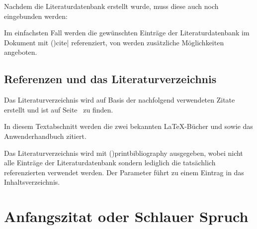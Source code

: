 \documentclass[%
  english,ngerman,%
  cdgeometry=no,DIV=12,%
  cd=false,cdfont=false,cdtitle=true,%
  headings=normal,%
  automark,%
  listof=toc,%
]{tudscrartcl}
\begin{document}
%
Nachdem die Literaturdatenbank erstellt wurde, muss diese auch noch eingebunden 
werden:
%
\begin{Preamble}


\end{Preamble}
%
Im einfachsten Fall werden die gewünschten Einträge der Literaturdatenbank im 
Dokument mit \Macro(){cite|} referenziert, 
von  werden zusätzliche Möglichkeiten angeboten.
%
\begin{refsection}
\begin{Trunk+}
\section{Referenzen und das Literaturverzeichnis}

Das Literaturverzeichnis wird auf Basis der nachfolgend verwendeten 
Zitate erstellt und ist auf Seite~\pageref{sec:bibliography} zu finden.
\end{Trunk+}
\begin{Trunk*}
In diesem Textabschnitt werden die zwei bekannten \LaTeX-Bücher
\cite{knuth84} und \cite{goossens94} sowie das Anwenderhandbuch
\cite{hanisch14} zitiert.

\end{Trunk*}
%
Das Literaturverzeichnis wird mit \Macro(){printbibliography} 
ausgegeben, wobei nicht alle Einträge der Literaturdatenbank sondern lediglich 
die tatsächlich referenzierten verwendet werden. Der Parameter 
 führt zu einem Eintrag in das Inhaltsverzeichnis.
%
\begin{Hint}
\printbibliography[heading=bibintoc]
\end{Hint}
\begin{quoting}[rightmargin=0pt]
\makeatletter
\let\markboth\@gobbletwo
\let\markright\@gobble
\makeatother
\printbibliography
\end{quoting}
\end{refsection}



\section{Anfangszitat oder Schlauer Spruch}
\end{document}
